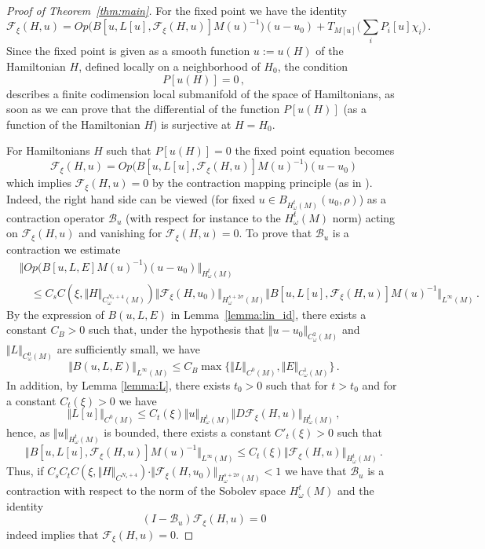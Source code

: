 \documentclass[11pt]{amsart}
\begin{document}
\begin{proof} [Proof of Theorem~\ref{thm:main}]
\smallskip
For the fixed point we have the identity
$$
\mathcal F_\xi (H, u) = Op \Big ( B[u, L[u], \mathcal F_\xi (H, u)] M(u)^{-1}  \Big) (u-u_0)  +  T_{M[u]} \Big(\sum_i  P_i[u] \chi_i  \Big)\,.
$$
Since the fixed point is given as a smooth function $u:=u(H)$ of the Hamiltonian $H$, defined locally on a neighborhood of $H_0$, the condition
$$
P[ u(H)] =0 \,,
$$ 
describes a finite codimension local submanifold of the space of Hamiltonians, as soon as we can prove that the differential of the function
$P[u(H)]$  (as a function of the Hamiltonian $H$) is surjective at $H=H_0$. 

For Hamiltonians $H$ such that $P[u(H)] =0$ the fixed point equation becomes
$$
\mathcal F_\xi (H, u) = Op \Big ( B[u, L[u], \mathcal F_\xi (H, u)] M(u)^{-1}  \Big) (u-u_0)  
$$
which implies $\mathcal F_\xi (H, u) =0$ by the contraction mapping principle (as in \cite{AlSh}).  Indeed, the right hand side can be viewed
(for fixed $u\in B_{H^t_\omega(M)} (u_0, \rho)$) as a contraction  operator $\mathcal B_u$ (with respect for instance to the $H^t_\omega(M)$ norm)  acting on
 $\mathcal F_\xi (H, u)$ and vanishing for $\mathcal F_\xi (H, u)=0$. To prove that $\mathcal B_u$ is a contraction we estimate
 $$
\begin{aligned} &\Vert Op \Big ( B[u,L, E] M(u)^{-1}  \Big) (u-u_0) \Vert_{H^t_\omega(M)}   \\ &\quad \leq    C_s C(\xi, \Vert H \Vert_{C^{N_s+4}_\omega(M)}) 
 \Vert \mathcal F_\xi (H, u_0) \Vert_{H^{s+2\sigma}_\omega(M)} \Vert  B[u, L[u], \mathcal F_\xi (H, u)] M(u)^{-1}   \Vert_{L^\infty(M)}    \,.
\end{aligned}
$$
By the expression of $B(u,L, E)$ in Lemma~\ref{lemma:lin_id}, there exists a constant $C_B >0$ such that, under the hypothesis that 
$\Vert u-u_0 \Vert_{C^2_\omega(M)}$ and $ \Vert L \Vert_{C^0_\omega(M)}$ are sufficiently small, we have 
$$
\Vert B(u,L, E) \Vert_{L^\infty(M)} \leq  C_B  \max \Big\{  \Vert L \Vert_{C^0(M)},  \Vert E\Vert_{C^1_\omega(M)} \big\} \,.
$$
In addition, by Lemma \ref{lemma:L}, there exists $t_0>0$ such that for $t>t_0$ and for a constant $C_t(\xi)>0$  we have
$$
\Vert L[u] \Vert _{C^0(M)}  \leq   C_{t}(\xi)  \Vert u \Vert_{H^t_\omega(M)} \Vert D\mathcal{F}_\xi(H, u)  \Vert_{H^t_\omega(M)} \,,
$$
hence, as $ \Vert u \Vert_{H^t_\omega(M)}$ is bounded, there exists  a constant $C'_t(\xi)>0$ such that
$$
\Vert B[u,L[u], \mathcal F_\xi (H, u) ] M(u)^{-1} \Vert_{L^\infty(M)}  \leq C_t(\xi) \Vert \mathcal F_\xi (H, u) \Vert_{H^t_\omega(M)}\,.
$$
Thus, if $C_s C_t C(\xi, \Vert H \Vert_{C^{N_s+4}}) \cdot
 \Vert \mathcal F_\xi (H, u_0) \Vert_{H^{s+2\sigma}_\omega(M)}  <1$ we have that $\mathcal B_u$ is a contraction
 with respect to the norm of the Sobolev space $H^t_\omega(M)$ and the identity
 $$
 (I - \mathcal B_u) \mathcal F_\xi (H, u) =0
 $$
indeed implies that $\mathcal F_\xi (H, u) =0$.


\end{proof}
\end{document}

